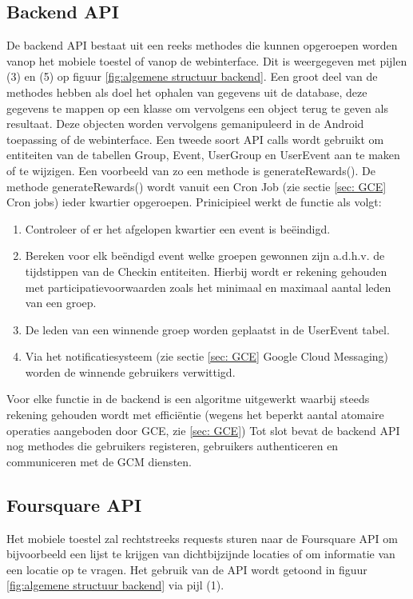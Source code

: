 \subsection{Backend API}
\label{backend API}
De backend API bestaat uit een reeks methodes die kunnen opgeroepen worden vanop het mobiele toestel of vanop de webinterface. Dit is weergegeven met pijlen (3) en (5) op figuur \ref{fig:algemene structuur backend}. Een groot deel van de methodes hebben als doel het ophalen van gegevens uit de database, deze gegevens te mappen op een klasse om vervolgens een object terug te geven als resultaat. Deze objecten worden vervolgens gemanipuleerd in de Android toepassing of de webinterface. Een tweede soort API calls wordt gebruikt om entiteiten van de tabellen Group, Event, UserGroup en UserEvent aan te maken of te wijzigen. Een voorbeeld van zo een methode is generateRewards(). De methode generateRewards() wordt vanuit een Cron Job (zie sectie \ref{sec: GCE} Cron jobs) ieder kwartier opgeroepen. Prinicipieel werkt de functie als volgt:
\begin{enumerate}
	\item Controleer of er het afgelopen kwartier een event is beëindigd.
	\item Bereken voor elk beëndigd event welke groepen gewonnen zijn a.d.h.v. de tijdstippen van de Checkin entiteiten. Hierbij wordt er rekening gehouden met participatievoorwaarden zoals het minimaal en maximaal aantal leden van een groep.
	\item De leden van een winnende groep worden geplaatst in de UserEvent tabel.
	\item Via het notificatiesysteem (zie sectie \ref{sec: GCE} Google Cloud Messaging) worden de winnende gebruikers verwittigd.
\end{enumerate}
Voor elke functie in de backend is een algoritme uitgewerkt waarbij steeds rekening gehouden wordt met efficiëntie (wegens het beperkt aantal atomaire operaties aangeboden door GCE, zie \ref{sec: GCE})
Tot slot bevat de backend API nog methodes die gebruikers registeren, gebruikers authenticeren en communiceren met de GCM diensten. 

\subsection{Foursquare API}
Het mobiele toestel zal rechtstreeks requests sturen naar de Foursquare API om bijvoorbeeld een lijst te krijgen van dichtbijzijnde locaties of om informatie van een locatie op te vragen. Het gebruik van de API wordt getoond in figuur \ref{fig:algemene structuur backend} via pijl (1).


